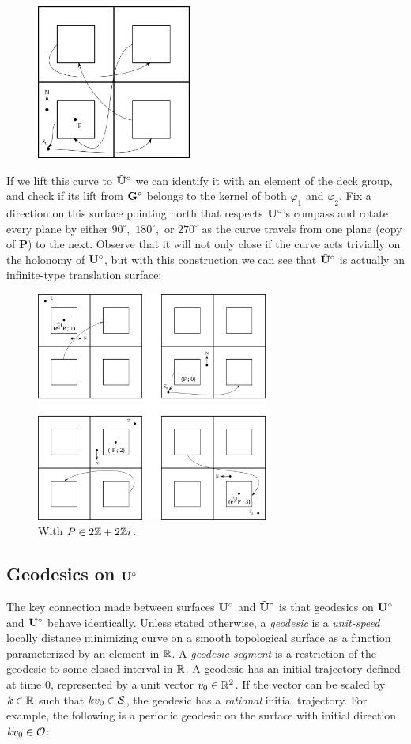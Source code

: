 \documentclass[]{article}
\def\btUs{\btU^\circ}
\begin{document}
\begin{figure}[H]
\centering
\includegraphics[width=2in]{overlay.png}
\end{figure}

\noindent If we lift this curve to $\btUs$ we can identify it with an element of the deck group, and check if its lift from $\mathbf{G}^\circ$ belongs to the kernel of both $\varphi_1$ and $\varphi_2$. Fix a direction on this surface pointing north that respects $\mathbf{U}^\circ$'s compass and rotate every plane by either $90^\circ,$ $180^\circ,$ or $270^\circ$ as the curve travels from one plane (copy of $\mathbf{P}$) to the next. Observe that it will not only close if the curve acts trivially on the holonomy of $\mathbf{U}^\circ$, but with this construction we can see that $\btUs$ is actually an infinite-type translation surface:

\begin{figure}[H]
\centering
\includegraphics[width=3in]{coverdirection.png}
\caption{With $P\in 2\mathbb{Z}+2\mathbb{Z} i$.}
\end{figure}

\noindent 

\subsection{Geodesics on $\mathbf{U}^\circ$}
The key connection made between surfaces $\mathbf{U}^\circ$ and $\btUs$ is that geodesics on $\mathbf{U}^\circ$ and $\btUs$ behave identically. Unless stated otherwise, a \emph{geodesic} is a \emph{unit-speed} locally distance minimizing curve on a smooth topological surface as a function parameterized by an element in $\mathbb{R}$. A \emph{geodesic segment} is a restriction of the geodesic to some closed interval in $\mathbb{R}$. A geodesic has an initial trajectory defined at time 0, represented by a unit vector $v_0\in\mathbb{R}^2$. If the vector can be scaled by $k\in\mathbb{R}$ such that $kv_0\in\mathcal{S}$, the geodesic has a \emph{rational} initial trajectory. For example, the following is a periodic geodesic on the surface with initial direction $kv_0\in\mathcal{O}$:
\end{document}
